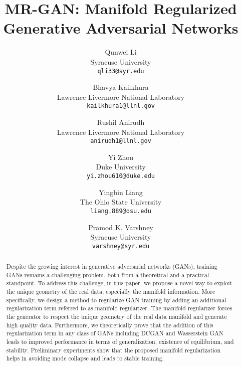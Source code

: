 \documentclass[10pt,twocolumn,letterpaper]{article}
\begin{document}
\title{MR-GAN: Manifold Regularized Generative Adversarial Networks}

\author{Qunwei Li\\
Syracuse University\\
{\tt\small qli33@syr.edu}
\and
Bhavya Kailkhura \\
Lawrence Livermore National Laboratory\\
{\tt\small kailkhura1@llnl.gov}
\and
Rushil Anirudh \\
Lawrence Livermore National Laboratory\\
{\tt\small anirudh1@llnl.gov}
\and
Yi Zhou \\
Duke University\\
{\tt\small yi.zhou610@duke.edu}
\and
Yingbin Liang \\
The Ohio State University\\
{\tt\small liang.889@osu.edu}
\and
Pramod K. Varshney \\
Syracuse University\\
{\tt\small varshney@syr.edu}
}

\maketitle

\begin{abstract}
Despite the growing interest in generative adversarial networks (GANs), training GANs remains a challenging problem, both from a theoretical and a practical standpoint. To address this challenge, in this paper, we propose a novel way to exploit the unique geometry of the real data, especially the manifold information. More specifically, we design a method to regularize GAN training by adding an additional regularization term referred to as manifold regularizer. The manifold regularizer forces the generator to respect the unique geometry of the real data manifold and generate high quality data. Furthermore, we theoretically prove that the addition of this regularization term in any class of GANs including DCGAN and Wasserstein GAN leads to improved performance in terms of generalization, existence of equilibrium, and stability. Preliminary experiments show that the proposed manifold regularization helps in avoiding mode collapse and leads to stable training.
\end{abstract}
\end{document}
